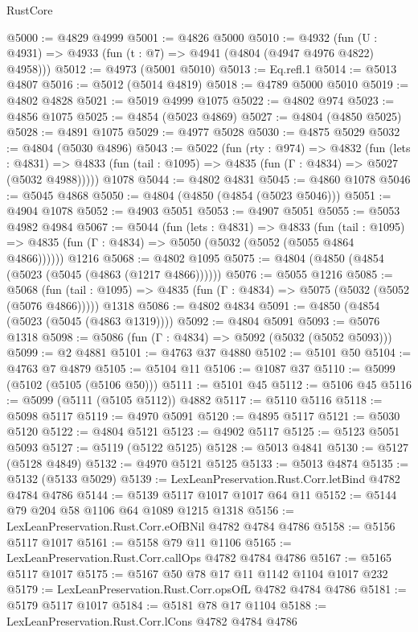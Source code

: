 \begin{lexlean}{RustCore}
\begin{coremodule}
@5000 := @4829 @4999
@5001 := @4826 @5000
@5010 := @4932 (fun (U : @4931) => @4933 (fun (t : @7) => @4941 (@4804 (@4947 @4976 @4822) @4958)))
@5012 := @4973 (@5001 @5010)
@5013 := Eq.refl.{1}
@5014 := @5013 @4807
@5016 := @5012 (@5014 @4819)
@5018 := @4789 @5000 @5010
@5019 := @4802 @4828
@5021 := @5019 @4999 @1075
@5022 := @4802 @974
@5023 := @4856 @1075
@5025 := @4854 (@5023 @4869)
@5027 := @4804 (@4850 @5025)
@5028 := @4891 @1075
@5029 := @4977 @5028
@5030 := @4875 @5029
@5032 := @4804 (@5030 @4896)
@5043 := @5022
    (fun (rty : @974) =>
    @4832
      (fun (lets : @4831) =>
      @4833 (fun (tail : @1095) => @4835 (fun (Γ : @4834) => @5027 (@5032 @4988)))))
    @1078
@5044 := @4802 @4831
@5045 := @4860 @1078
@5046 := @5045 @4868
@5050 := @4804 (@4850 (@4854 (@5023 @5046)))
@5051 := @4904 @1078
@5052 := @4903 @5051
@5053 := @4907 @5051
@5055 := @5053 @4982 @4984
@5067 := @5044
    (fun (lets : @4831) =>
    @4833
      (fun (tail : @1095) => @4835 (fun (Γ : @4834) => @5050 (@5032 (@5052 (@5055 @4864 @4866))))))
    @1216
@5068 := @4802 @1095
@5075 := @4804 (@4850 (@4854 (@5023 (@5045 (@4863 (@1217 @4866))))))
@5076 := @5055 @1216
@5085 := @5068
    (fun (tail : @1095) => @4835 (fun (Γ : @4834) => @5075 (@5032 (@5052 (@5076 @4866)))))
    @1318
@5086 := @4802 @4834
@5091 := @4850 (@4854 (@5023 (@5045 (@4863 @1319))))
@5092 := @4804 @5091
@5093 := @5076 @1318
@5098 := @5086 (fun (Γ : @4834) => @5092 (@5032 (@5052 @5093)))
@5099 := @2 @4881
@5101 := @4763 @37 @4880
@5102 := @5101 @50
@5104 := @4763 @7 @4879
@5105 := @5104 @11
@5106 := @1087 @37
@5110 := @5099 (@5102 (@5105 (@5106 @50)))
@5111 := @5101 @45
@5112 := @5106 @45
@5116 := @5099 (@5111 (@5105 @5112)) @4882
@5117 := @5110 @5116
@5118 := @5098 @5117
@5119 := @4970 @5091
@5120 := @4895 @5117
@5121 := @5030 @5120
@5122 := @4804 @5121
@5123 := @4902 @5117
@5125 := @5123 @5051 @5093
@5127 := @5119 (@5122 @5125)
@5128 := @5013 @4841
@5130 := @5127 (@5128 @4849)
@5132 := @4970 @5121 @5125
@5133 := @5013 @4874
@5135 := @5132 (@5133 @5029)
@5139 := LexLeanPreservation.Rust.Corr.letBind @4782 @4784 @4786
@5144 := @5139 @5117 @1017 @1017 @64 @11
@5152 := @5144 @79 @204 @58 @1106 @64 @1089 @1215 @1318
@5156 := LexLeanPreservation.Rust.Corr.eOfBNil @4782 @4784 @4786
@5158 := @5156 @5117 @1017
@5161 := @5158 @79 @11 @1106
@5165 := LexLeanPreservation.Rust.Corr.callOps @4782 @4784 @4786
@5167 := @5165 @5117 @1017
@5175 := @5167 @50 @78 @17 @11 @1142 @1104 @1017 @232
@5179 := LexLeanPreservation.Rust.Corr.opsOfL @4782 @4784 @4786
@5181 := @5179 @5117 @1017
@5184 := @5181 @78 @17 @1104
@5188 := LexLeanPreservation.Rust.Corr.lCons @4782 @4784 @4786

\end{coremodule}
\end{lexlean}
